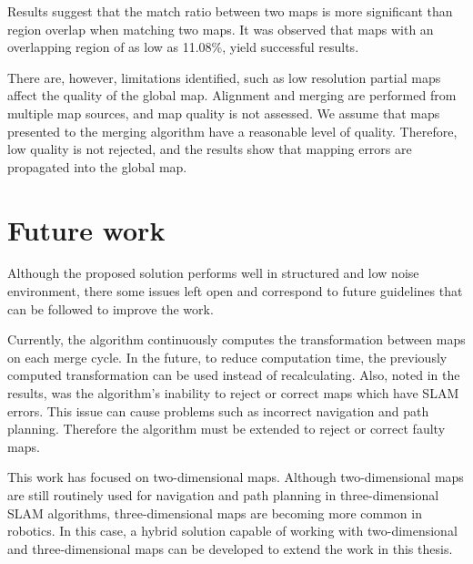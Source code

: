 Results suggest that the match ratio between two maps is more significant than region overlap when matching two maps. It was observed that maps with an overlapping region of as low as 11.08\%, yield successful results.

There are, however, limitations identified, such as low resolution partial maps affect the quality of the global map. Alignment and merging are performed from multiple map sources, and map quality is not assessed. We assume that maps presented to the merging algorithm have a reasonable level of quality. Therefore, low quality is not rejected, and the results show that mapping errors are propagated into the global map.



\section{Future work}

Although the proposed solution performs well in structured and low noise environment, there some issues left open and correspond to future guidelines that can be followed to improve the work. 

Currently, the algorithm continuously computes the transformation between maps on each merge cycle. In the future, to reduce computation time, the previously computed transformation can be used instead of recalculating. Also, noted in the results, was the algorithm's inability to reject or correct maps which have SLAM errors. This issue can cause problems such as incorrect navigation and path planning. Therefore the algorithm must be extended to reject or correct faulty maps.

This work has focused on two-dimensional maps. Although two-dimensional maps are still routinely used for navigation and path planning in three-dimensional SLAM algorithms, three-dimensional maps are becoming more common in robotics. In this case, a hybrid solution capable of working with two-dimensional and three-dimensional maps can be developed to extend the work in this thesis.



